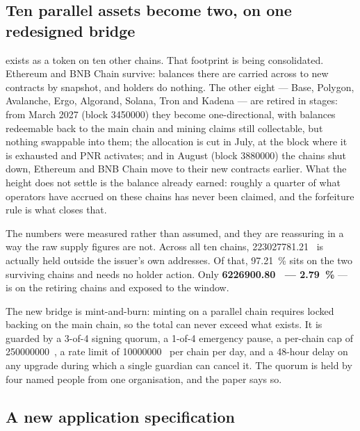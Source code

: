 \subsection{Ten parallel assets become two, on one redesigned bridge}

\Flux{} exists as a token on ten other chains. That footprint is being consolidated. Ethereum and
BNB Chain survive: balances there are carried across to new contracts by snapshot, and holders do
nothing. The other eight --- Base, Polygon, Avalanche, Ergo, Algorand, Solana, Tron and Kadena ---
are retired in stages: from March 2027 (block \num{3450000}) they become one-directional, with balances redeemable back to
the main chain and mining claims still collectable, but nothing swappable into them; the allocation
is cut in July, at the block where
it is exhausted and PNR activates; and in August (block \num{3880000}) the chains shut down,  Ethereum and BNB Chain move to their new contracts earlier. What the height does
not settle is the balance already earned: roughly a quarter of what operators have accrued on these
chains has never been claimed, and the forfeiture rule is what closes that.

The numbers were measured rather than assumed, and they are reassuring in a way the raw supply
figures are not. Across all ten chains, \num{223027781.21}~\flux{} is actually held outside the
issuer's own addresses. Of that, \SI{97.21}{\percent} sits on the two surviving chains and needs
no holder action. Only \textbf{\num{6226900.80}~\flux{} --- \SI{2.79}{\percent}} --- is on the
retiring chains and exposed to the window.

The new bridge is mint-and-burn: minting on a parallel chain requires locked backing on the main
chain, so the total can never exceed what exists. It is guarded by a 3-of-4 signing quorum, a
1-of-4 emergency pause, a per-chain cap of \num{250000000}~\flux{}, a rate limit of
\num{10000000}~\flux{} per chain per day, and a 48-hour delay on any upgrade during which a
single guardian can cancel it. The quorum is held by four named people from one organisation,
and the paper says so.

\subsection{A new application specification}

